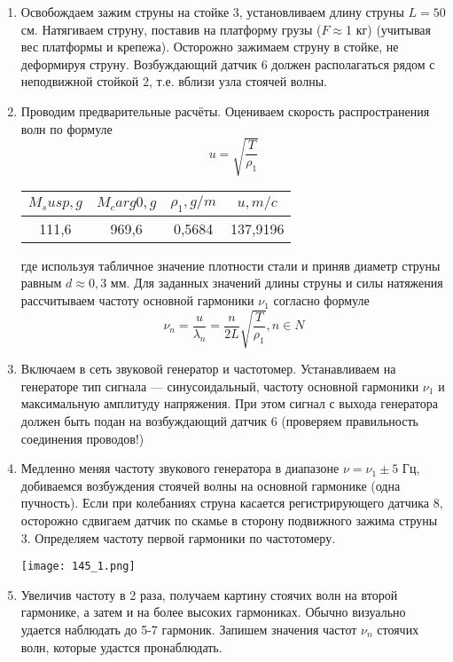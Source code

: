 \documentclass[a4paper, 12pt]{article}%
\begin{document}
\begin{enumerate}
\item Освобождаем зажим струны на стойке 3, установливаем длину струны $L = 50$ см. Натягиваем струну, поставив на платформу грузы ($F \approx $1 кг) (учитывая вес платформы и крепежа). Осторожно зажимаем струну в стойке, не деформируя струну. Возбуждающий датчик 6 должен располагаться рядом с неподвижной стойкой 2, т.е. вблизи узла стоячей волны.
\item Проводим предварительные расчёты. Оцениваем скорость распространения волн по формуле 
\[u = \sqrt{\dfrac{T}{\rho_1}}\] 
\begin{center}
\begin{tabular}{|c|c|c|c|}
\hline
$M_susp, g$ & $M_carg0, g$ & $\rho_1, g/m$ & $u, m/c$ \\ \hline
111,6       & 969,6        & 0,5684        & 137,9196 \\ \hline
\end{tabular}
\end{center}
\newpage
где  используя табличное значение плотности стали и приняв диаметр струны равным $d \approx 0,3$ мм. Для заданных значений длины струны и силы натяжения рассчитываем частоту основной гармоники $\nu_1$ согласно формуле
\[ \nu_n = \dfrac{u}{\lambda_n} = \dfrac{n}{2L} \sqrt{\dfrac{T}{\rho_1}}, n \in N\]
\item Включаем в сеть звуковой генератор и частотомер. Устанавливаем на генераторе тип сигнала — синусоидальный, частоту основной гармоники $\nu_1$ и максимальную амплитуду напряжения. При этом сигнал с выхода генератора должен быть подан на возбуждающий датчик 6 (проверяем правильность соединения проводов!)
\item Медленно меняя частоту звукового генератора в диапазоне $\nu = \nu_1 \pm 5$ Гц, добиваемся возбуждения стоячей волны на основной гармонике (одна пучность). Если при колебаниях струна касается регистрирующего датчика 8, осторожно сдвигаем датчик по скамье в сторону подвижного зажима струны 3. Определяем частоту первой гармоники по частотомеру.\\
\begin{center}
\texttt{[image: 145\_1.png]}
\end{center}
\item Увеличив частоту в 2 раза, получаем картину стоячих волн на второй гармонике, а затем и на более высоких гармониках. Обычно визуально удается наблюдать до 5-7 гармоник. Запишем значения частот $\nu_n$ стоячих волн, которые удастся пронаблюдать.

\end{enumerate}
\end{document}
